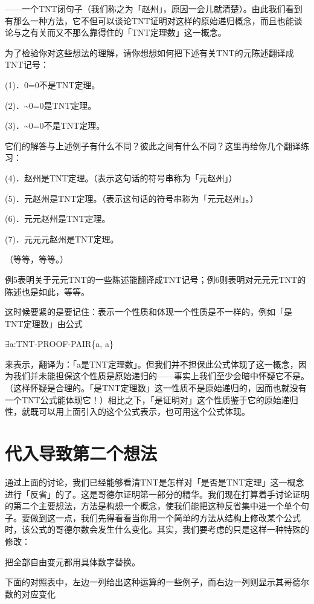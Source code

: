 \documentclass[
  12pt,
  twoside,
  openright,
  oldfontcommands,
]{memoir}
\begin{document}
------一个TNT闭句子（我们称之为「赵州」，原因一会儿就清楚）。由此我们看到有那么一种方法，它不但可以谈论TNT证明对这样的原始递归概念，而且也能谈论与之有关而又不那么靠得住的「TNT定理数」这一概念。

为了检验你对这些想法的理解，请你想想如何把下述有关TNT的元陈述翻译成TNT记号：

(1)．0=0不是TNT定理。

(2)．\textasciitilde0=0是TNT定理。

(3)．\textasciitilde0=0不是TNT定理。

它们的解答与上述例子有什么不同？彼此之间有什么不同？这里再给你几个翻译练习：

(4)．赵州是TNT定理。（表示这句话的符号串称为「元赵州」）

(5)．元赵州是TNT定理。（表示这句话的符号串称为「元元赵州」。）

(6)．元元赵州是TNT定理。

(7)．元元元赵州是TNT定理。

（等等，等等。）

例5表明关于元元TNT的一些陈述能翻译成TNT记号；例6则表明对元元元TNT的陈述也是如此，等等。

这时候要紧的是要记住：表示一个性质和体现一个性质是不一样的，例如「是TNT定理数」由公式

$\exists$a:TNT-PROOF-PAIR\{a, a\textquotesingle\}

来表示，翻译为：「a\textquotesingle 是TNT定理数」。但我们并不担保此公式体现了这一概念，因为我们并未能担保这个性质是原始递归的------事实上我们至少会暗中怀疑它不是。（这样怀疑是合理的。「是TNT定理数」这一性质不是原始递归的，因而也就没有一个TNT公式能体现它！）相比之下，「是证明对」这个性质鉴于它的原始递归性，就既可以用上面引入的这个公式表示，也可用这个公式体现。

\section{代入导致第二个想法}

通过上面的讨论，我们已经能够看清TNT是怎样对「是否是TNT定理」这一概念进行「反省」的了。这是哥德尔证明第一部分的精华。我们现在打算着手讨论证明的第二个主要想法，方法是构想一个概念，使我们能把这种反省集中进一个单个句子。要做到这一点，我们先得看看当你用一个简单的方法从结构上修改某个公式时，该公式的哥德尔数会发生什么变化。其实，我们要考虑的只是这样一种特殊的修改：

{把全部自由变元都用具体数字替换。}

下面的对照表中，左边一列给出这种运算的一些例子，而右边一列则显示其哥德尔数的对应变化
\end{document}
